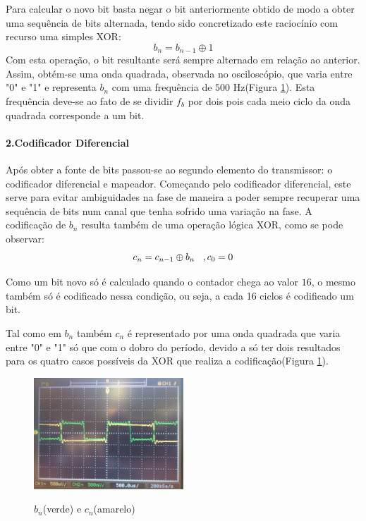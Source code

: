 \documentclass[11pt]{article}
\numberwithin{equation}{section}
\begin{document}
	Para calcular o novo bit basta negar o bit anteriormente obtido de modo a obter uma sequência de bits alternada, tendo sido concretizado este raciocínio com recurso uma simples XOR:
	\begin{equation}
	b_n=b_{n-1} \oplus 1
	\end{equation}
	Com esta operação, o bit resultante será sempre alternado em relação ao anterior.
	Assim, obtém-se uma onda quadrada, observada no osciloscópio, que varia entre "0" e "1" e representa $ b_n $  com uma frequência de $500$ Hz(Figura \ref{bn_cn}). Esta frequência deve-se ao fato de se dividir  $f_b$ por dois pois cada meio ciclo da onda quadrada corresponde a um bit.  
	
	\paragraph{2.Codificador Diferencial} \hspace{0pt} \label{para:P2-2}
	
	Após obter a fonte de bits passou-se ao segundo elemento do transmissor: o codificador diferencial e mapeador. Começando pelo codificador diferencial, este serve para evitar ambiguidades na fase de maneira a poder sempre recuperar uma sequência de bits num canal que tenha sofrido uma variação na fase.
	A codificação de $b_n$ resulta também de uma operação lógica XOR, como se pode observar: 
	\begin{equation}
	c_n=c_{n-1} \oplus b_n \hspace{3 mm} ,c_0=0
	\end{equation}
	
	Como um bit novo só é calculado quando o contador chega ao valor $16$, o mesmo também só é codificado nessa condição, ou seja, a cada 16 ciclos é codificado um bit. 
	
	Tal como em $ b_n $ também $ c_n $ é representado por uma onda quadrada que varia entre "0" e "1" só que com o dobro do período, devido a só ter dois resultados para os quatro casos possíveis da XOR que realiza a codificação(Figura \ref{bn_cn}).
	\begin{figure}[H]
		\centering
		\includegraphics[width=0.5\textwidth]{./bn_cn}~\\
		\caption{$ b_n $(verde) e $ c_n $(amarelo)}
		\label{bn_cn}
	\end{figure}
	
\end{document}
